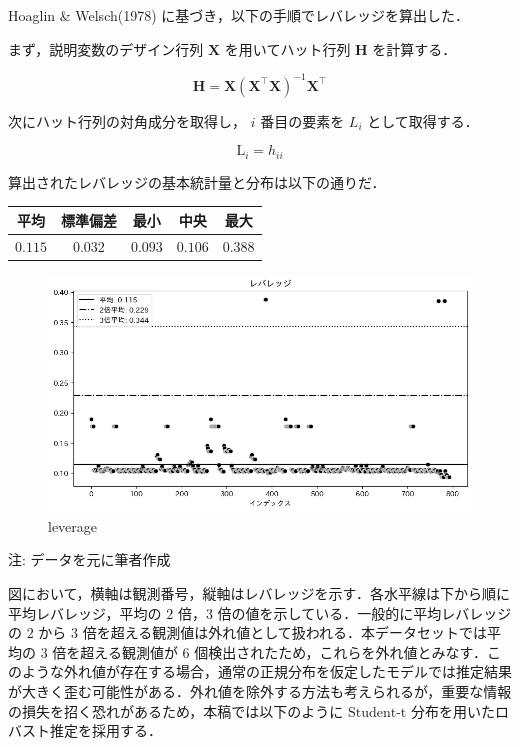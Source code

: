 Hoaglin \& Welsch(1978) に基づき，以下の手順でレバレッジを算出した．

まず，説明変数のデザイン行列 \(\mathbf{{X}}\) を用いてハット行列
\(\mathbf{H}\) を計算する．

\[
\mathbf{H} = \mathbf{X}(\mathbf{X}^{\top}\mathbf{X})^{-1}\mathbf{X}^{\top}
\]

次にハット行列の対角成分を取得し， \(i\) 番目の要素を \(L_i\)
として取得する．

\[
\text{L}_{i} = h_{ii}
\]

算出されたレバレッジの基本統計量と分布は以下の通りだ．

\begin{longtable}[]{@{}ccccc@{}}
\toprule
平均 & 標準偏差 & 最小 & 中央 & 最大\tabularnewline
\midrule
\endhead
\(0.115\) & \(0.032\) & \(0.093\) & \(0.106\) & \(0.388\)\tabularnewline
\bottomrule
\end{longtable}

\begin{figure}
\centering
\includegraphics{../figures/define_models/leverage.png}
\caption{leverage}
\end{figure}

注: データを元に筆者作成

図において，横軸は観測番号，縦軸はレバレッジを示す．各水平線は下から順に平均レバレッジ，平均の
\(2\) 倍，\(3\) 倍の値を示している．一般的に平均レバレッジの \(2\) から
\(3\) 倍を超える観測値は外れ値として扱われる．本データセットでは平均の
\(3\) 倍を超える観測値が \(6\)
個検出されたため，これらを外れ値とみなす．このような外れ値が存在する場合，通常の正規分布を仮定したモデルでは推定結果が大きく歪む可能性がある．外れ値を除外する方法も考えられるが，重要な情報の損失を招く恐れがあるため，本稿では以下のように
\(\text{Student-t}\) 分布を用いたロバスト推定を採用する．

